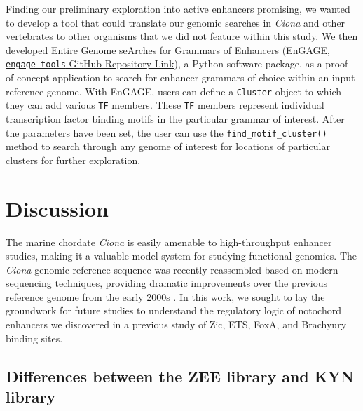 Finding our preliminary exploration into active enhancers promising, we wanted to develop a tool that could translate our genomic searches in \textit{Ciona} and other vertebrates to other organisms that we did not feature within this study. We then developed Entire Genome seArches for Grammars of Enhancers (EnGAGE, \href{https://github.com/mragsac/engage-tools}{\texttt{engage-tools} GitHub Repository Link}), a Python software package, as a proof of concept application to search for enhancer grammars of choice within an input reference genome. With EnGAGE, users can define a \verb|Cluster| object to which they can add various \verb|TF| members. These \verb|TF| members represent individual transcription factor binding motifs in the particular grammar of interest. After the parameters have been set, the user can use the \verb|find_motif_cluster()| method to search through any genome of interest for locations of particular clusters for further exploration.

\section{Discussion}

The marine chordate \textit{Ciona} is easily amenable to high-throughput enhancer studies, making it a valuable model system for studying functional genomics. The \textit{Ciona} genomic reference sequence was recently reassembled based on modern sequencing techniques, providing dramatic improvements over the previous reference genome from the early 2000s \cite{satou2019,dehal2002}. In this work, we sought to lay the groundwork for future studies to understand the regulatory logic of notochord enhancers we discovered in a previous study of Zic, ETS, FoxA, and Brachyury binding sites. 

\subsection{Differences between the ZEE library and KYN library}

